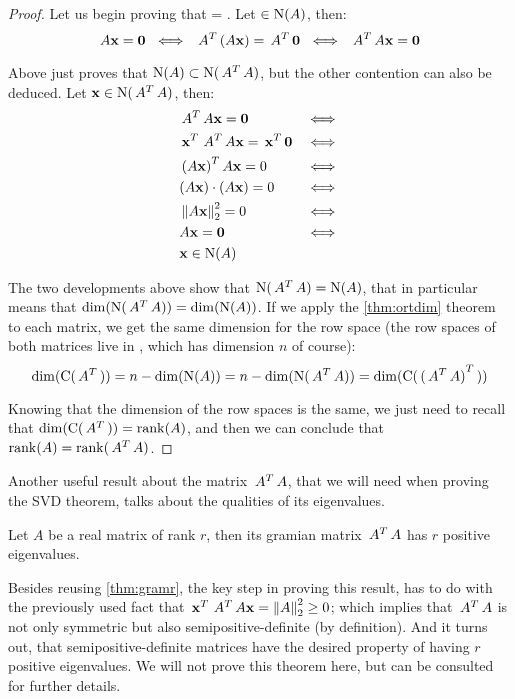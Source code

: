 \begin{proof}
Let us begin proving that  = .  Let  $\in
\operatorname{N}(A)$, then: \\ 

\[
A\mathbf{x} = \mathbf{0} \,\,\iff\,\, \,{A}^{T}\,(A\mathbf{x}) = \,{A}^{T}\,\mathbf{0}
\,\,\iff\,\, \,{A}^{T}\,A\mathbf{x} = \mathbf{0}
\]
\hfill

Above just proves that $\operatorname{N}(A) \subset \operatorname{N}(\,{A}^{T}\,A)$, but the other
contention can also be deduced. Let $\mathbf{x} \in \operatorname{N}(\,{A}^{T}\,A)$, then: \\

\begin{align*}
& \,{A}^{T}\,A\mathbf{x} = \mathbf{0} &\iff \\
& \,{\mathbf{x}}^{T}\,\,{A}^{T}\,A\mathbf{x} = \,{\mathbf{x}}^{T}\,\mathbf{0} &\iff \\
& \,{(A\mathbf{x})}^{T}\, A\mathbf{x} = 0 & \iff \\
& (A\mathbf{x}) \cdot (A\mathbf{x}) = 0 & \iff \\
& \left\lVert A\mathbf{x} \right\rVert_2^2 = 0 & \iff \\
& A\mathbf{x} = \mathbf{0} & \iff \\
& \mathbf{x} \in \operatorname{N}(A)
\end{align*}
\hfill

The two developments above show that $\operatorname{N}(\,{A}^{T}\,A) = \operatorname{N}(A)$, that in
particular means that $\operatorname{dim}(\operatorname{N}(\,{A}^{T}\,A)) = \operatorname{dim}(\operatorname{N}(A))$. If we
apply the \cref{thm:ortdim} theorem to each matrix, we get the same
dimension for the row space (the row spaces of both matrices live in
, which has dimension $n$ of course): \\

\[
\operatorname{dim}(\operatorname{C}(\,{A}^{T}\,)) = n - \operatorname{dim}(\operatorname{N}(A)) = n - \operatorname{dim}(\operatorname{N}(\,{A}^{T}\,A)) = \operatorname{dim}(\operatorname{C}(\,{(\,{A}^{T}\,A)}^{T}\,))
\]
\hfill

Knowing that the dimension of the row spaces is the same, we just need
to recall that $\operatorname{dim}(\operatorname{C}(\,{A}^{T}\,)) = \operatorname{rank}(A)$, and then we can
conclude that $\operatorname{rank}(A) = \operatorname{rank}(\,{A}^{T}\,A)$.
\end{proof}
\hfill

Another useful result about the matrix $\,{A}^{T}\,A$, that we will need
when proving the SVD theorem, talks about the qualities of its
eigenvalues. \\

\begin{theorem}
\label{thm:grameig}
Let $A$ be a real matrix of rank $r$, then its gramian matrix
$\,{A}^{T}\,A$ has $r$ positive eigenvalues. 
\end{theorem}
\hfill

Besides reusing \cref{thm:gramr}, the key step in proving 
this result, has to do with the previously 
used fact that $\,{\mathbf{x}}^{T}\,\,{A}^{T}\,A\mathbf{x} = 
\left\lVert A \right\rVert_2^2 \ge 0$; which implies that $\,{A}^{T}\,A$ is not only symmetric
but also semipositive-definite (by definition). And it turns out, that
semipositive-definite matrices have the desired property of having $r$
positive eigenvalues. We will not prove this theorem here, but
\cite{strang88} can be consulted for further details. 




